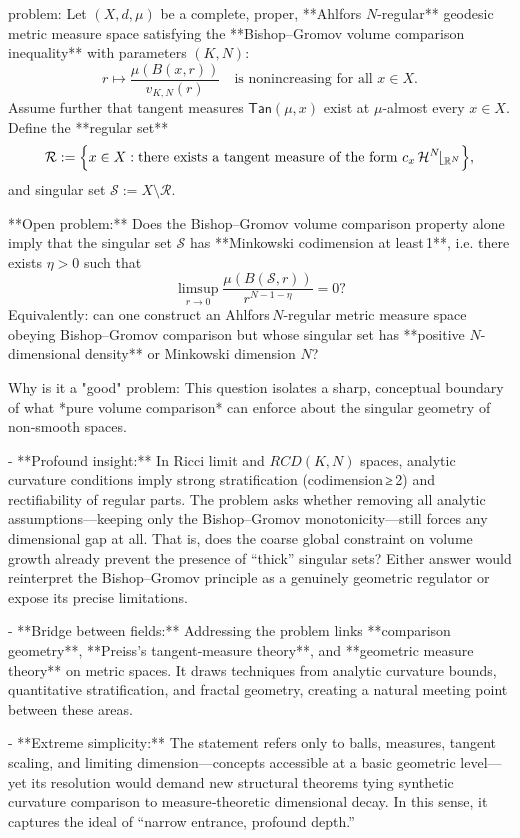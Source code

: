 problem:  
Let \((X,d,\mu)\) be a complete, proper, **Ahlfors \(N\)-regular** geodesic metric measure space satisfying the **Bishop–Gromov volume comparison inequality** with parameters \((K,N)\):
\[
r \mapsto \frac{\mu(B(x,r))}{v_{K,N}(r)} \quad \text{is nonincreasing for all } x\in X.
\]
Assume further that tangent measures \(\mathsf{Tan}(\mu,x)\) exist at \(\mu\)-almost every \(x\in X\).  
Define the **regular set**
\[
\mathcal{R} := \Bigl\{ x\in X : \text{there exists a tangent measure of the form } c_x\,\mathcal{H}^N\!\lfloor_{\mathbb{R}^N}\Bigr\},
\]
and singular set \(\mathcal{S} := X\setminus \mathcal{R}\).

**Open problem:**  
Does the Bishop–Gromov volume comparison property alone imply that the singular set \(\mathcal{S}\) has **Minkowski codimension at least 1**, i.e. there exists \(\eta>0\) such that
\[
\limsup_{r\to 0} \frac{\mu(B(\mathcal{S},r))}{r^{N-1-\eta}} = 0 ?
\]
Equivalently: can one construct an Ahlfors \(N\)-regular metric measure space obeying Bishop–Gromov comparison but whose singular set has **positive \(N\)-dimensional density** or Minkowski dimension \(N\)?  

Why is it a "good" problem:  
This question isolates a sharp, conceptual boundary of what *pure volume comparison* can enforce about the singular geometry of non‑smooth spaces.

- **Profound insight:** In Ricci limit and \(RCD(K,N)\) spaces, analytic curvature conditions imply strong stratification (codimension ≥ 2) and rectifiability of regular parts. The problem asks whether removing all analytic assumptions—keeping only the Bishop–Gromov monotonicity—still forces any dimensional gap at all. That is, does the coarse global constraint on volume growth already prevent the presence of “thick” singular sets? Either answer would reinterpret the Bishop–Gromov principle as a genuinely geometric regulator or expose its precise limitations.  

- **Bridge between fields:** Addressing the problem links **comparison geometry**, **Preiss’s tangent‑measure theory**, and **geometric measure theory** on metric spaces. It draws techniques from analytic curvature bounds, quantitative stratification, and fractal geometry, creating a natural meeting point between these areas.  

- **Extreme simplicity:** The statement refers only to balls, measures, tangent scaling, and limiting dimension—concepts accessible at a basic geometric level—yet its resolution would demand new structural theorems tying synthetic curvature comparison to measure‑theoretic dimensional decay. In this sense, it captures the ideal of “narrow entrance, profound depth.”